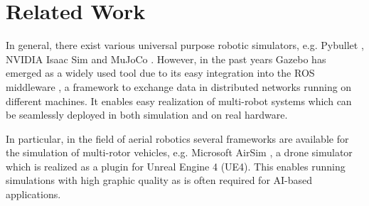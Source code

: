 \section{Related Work} \label{sec:related_work}
In general, there exist various universal purpose robotic simulators, e.g. Pybullet \cite{pybullet}, NVIDIA Isaac Sim \cite{isaac_sim} and MuJoCo \cite{todorov2012}. However, in the past years Gazebo  \cite{gazebo} has emerged as a widely used tool \cite{sarabakha2023} due to its easy integration into the ROS middleware \cite{quigley09}, a framework to exchange data in distributed networks running on different machines. It enables easy realization of multi-robot systems which can be seamlessly deployed in both simulation and on real hardware. 

In particular, in the field of aerial robotics several frameworks are available for the simulation of multi-rotor vehicles, e.g. Microsoft AirSim \cite{airsim}, a drone simulator which is realized as a plugin for Unreal Engine 4 (UE4). This enables running simulations with high graphic quality as is often required for AI-based applications.

